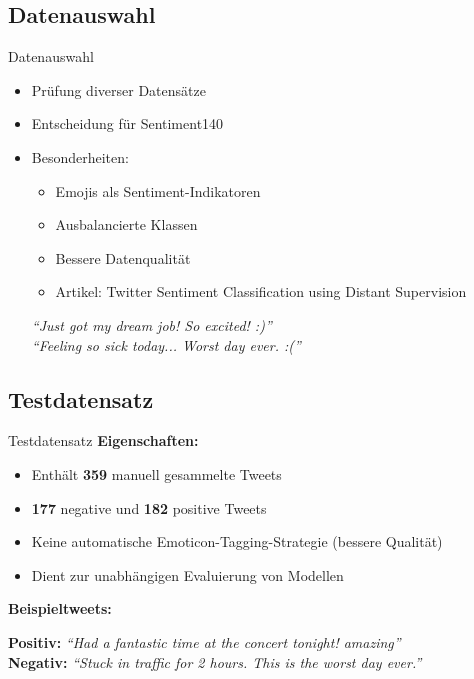 \documentclass[aspectratio=169]{beamer} %
\begin{document}
\subsection{Datenauswahl}
\begin{frame}{Datenauswahl}
  \begin{itemize}
      \item Prüfung diverser Datensätze
      \item Entscheidung für \glqq Sentiment140\grqq
      \item Besonderheiten:
      \begin{itemize}
          \item Emojis als Sentiment-Indikatoren
          \item Ausbalancierte Klassen
          \item Bessere Datenqualität
          \item Artikel: \glqq Twitter Sentiment Classification using Distant Supervision\grqq
      \end{itemize}

      \vspace{0.5cm}
  \vspace{0.2cm}

   \textit{“Just got my dream job! So excited! :)”} \\
   \textit{“Feeling so sick today... Worst day ever. :(”} \\

  \end{itemize}
\end{frame}

\subsection{Testdatensatz}
\begin{frame}{Testdatensatz}
  \textbf{Eigenschaften:}
  \begin{itemize}
      \item Enthält \textbf{359} manuell gesammelte Tweets
      \item \textbf{177} negative und \textbf{182} positive Tweets
      \item Keine automatische Emoticon-Tagging-Strategie (bessere Qualität)
      \item Dient zur unabhängigen Evaluierung von Modellen
  \end{itemize}

  \vspace{0.5cm}
  \textbf{Beispieltweets:}
  \vspace{0.2cm}

  \textbf{Positiv:} \textit{“Had a fantastic time at the concert tonight! amazing”} \\
  \textbf{Negativ:} \textit{“Stuck in traffic for 2 hours. This is the worst day ever.”}

\end{frame}
\end{document}
